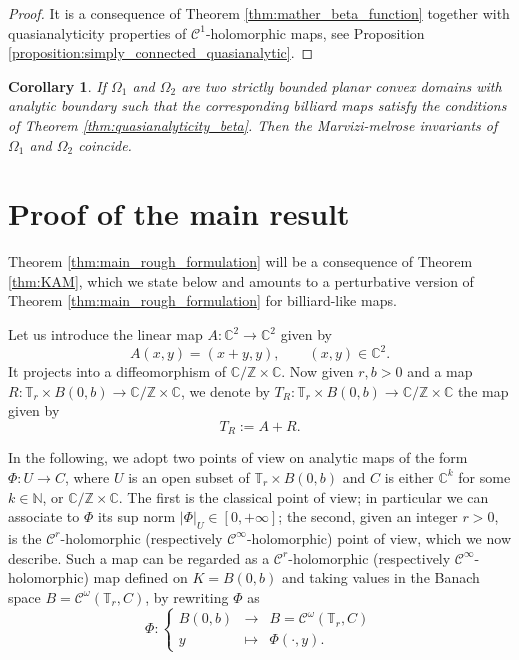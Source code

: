 \documentclass[10pt]{article}
\newtheorem{corollary}[theorem]{Corollary}
\newcommand{\Z}{\mathbb{Z}}
\newcommand{\N}{\mathbb{N}}
\newcommand{\C}{\mathbb{C}}
\newcommand{\T}{\mathbb{T}}
\begin{document}
\begin{proof}
It is a consequence of Theorem \ref{thm:mather_beta_function} together with quasianalyticity properties of $\mathscr C^1$-holomorphic maps, see Proposition \ref{proposition:simply_connected_quasianalytic}.  
\end{proof}

\begin{corollary}
    \label{cor:mm_answer}
    If $\Omega_1$ and $\Omega_2$ are two strictly bounded planar convex domains with analytic boundary such that the corresponding billiard maps satisfy the conditions of Theorem \ref{thm:quasianalyticity_beta}. Then the Marvizi-melrose invariants of $\Omega_1$ and $\Omega_2$ coincide.
\end{corollary}

\section{Proof of the main result}
Theorem \ref{thm:main_rough_formulation} will be a consequence of Theorem \ref{thm:KAM}, which we state below and amounts to a perturbative version of Theorem \ref{thm:main_rough_formulation} for billiard-like maps.

Let us introduce the linear map $A:\C^2\to\C^2$ given by 
\[
A(x, y) = (x+y,y),
\qquad (x,y)\in\C^2.
\]
It projects into a diffeomorphism of $\C/\Z\times \C$. Now given $r,b>0$ and a map $R: \T_r \times B(0, b) \to \C/\Z\times\C$, we denote by $T_R:\T_{r}\times B(0, b) \to \C/\Z\times\C$ the map given by 
\begin{equation}
\label{eq:perturbation_form}
T_R := A+R.
\end{equation}

In the following, we adopt two points of view on analytic maps of the form $\Phi:U\to C$, where $U$ is an open subset of $\T_r\times B(0,b)$ and $C$ is either $\C^k$ for some $k\in\N$, or $\C/\Z\times \C$. The first is the classical point of view; in particular we can associate to $\Phi$ its sup norm $|\Phi|_U\in[0,+\infty]$; the second, given an integer $r>0$, is the $\mathscr C^r$-holomorphic (respectively $\mathscr C^\infty$-holomorphic) point of view, which we now describe. Such a map can be regarded as a $\mathscr C^r$-holomorphic (respectively $\mathscr C^\infty$-holomorphic) map defined on $K=B(0,b)$ and taking values in the Banach space $B=\mathscr C^\omega(\T_r,C)$, by rewriting $\Phi$ as
\[
\Phi:\left\{
\begin{array}{ccc}
    B(0,b) & \to & B=\mathscr C^\omega(\T_r,C) \\
    y & \mapsto &\Phi(\cdot,y). 
\end{array}
\right.
\]
\end{document}

